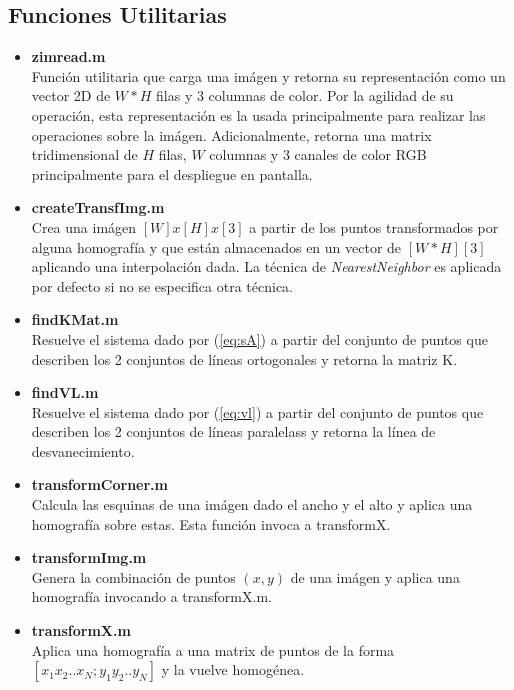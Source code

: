 \documentclass{IEEEtran}
\begin{document}
\subsection{Funciones Utilitarias}

\begin{itemize}
\item \textbf{zimread.m} ~\\
Función utilitaria que carga una imágen y retorna su 
representación como un vector 2D de
$W*H$ filas y 3 columnas de color. Por la agilidad de su operación,
esta representación es la usada principalmente para realizar 
las operaciones sobre la imágen.
Adicionalmente, retorna una matrix tridimensional 
de $H$ filas, $W$ columnas y 3 canales de color RGB principalmente
para el despliegue en pantalla.

\item \textbf{createTransfImg.m} ~\\
Crea una imágen $[W]x[H]x[3]$ a partir de los puntos transformados
por alguna homografía y que están almacenados en un vector
de $[W*H][3]$ aplicando una interpolación dada. La técnica de
\textit{NearestNeighbor} es aplicada por defecto si no se 
especifica otra técnica.

\item \textbf{findKMat.m} ~\\
Resuelve el sistema dado por (\ref{eq:sA}) a partir del
conjunto de puntos que describen los 2 conjuntos de líneas
ortogonales y retorna la matriz K. 

\item \textbf{findVL.m} ~\\
Resuelve el sistema dado por (\ref{eq:vl}) a partir del
conjunto de puntos que describen los 2 conjuntos de líneas
paralelass y retorna la línea de desvanecimiento.

\item \textbf{transformCorner.m} ~\\
Calcula las esquinas de una imágen dado el ancho y el alto
y aplica una homografía sobre estas. Esta función invoca a transformX.

\item \textbf{transformImg.m} ~\\
Genera la combinación de puntos $(x,y)$ de una imágen y aplica
una homografía invocando a transformX.m.

\item \textbf{transformX.m} ~\\
Aplica una homografía a una matrix de puntos de la forma
$[x_1 x_2 .. x_N; y_1 y_2 .. y_N]$ y la vuelve homogénea.


\end{itemize} 
\end{document}
